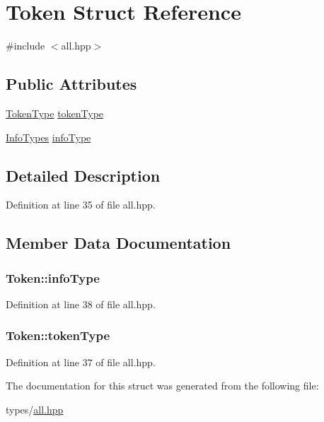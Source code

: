 \hypertarget{struct_token}{}\section{Token Struct Reference}
\label{struct_token}


{\ttfamily \#include $<$all.\+hpp$>$}

\subsection*{Public Attributes}
\begin{DoxyCompactItemize}
\item 
\hyperlink{arch_8hpp_aa520fbf142ba1e7e659590c07da31921}{Token\+Type} \hyperlink{struct_token_a3d2b3146021ae2acd9e1b33bf5e59c78}{token\+Type}
\item 
\hyperlink{all_8hpp_a58b4bafc5e94cba5e42b944a85b061db}{Info\+Types} \hyperlink{struct_token_a725d6f27445b5fdbb28a551c121779eb}{info\+Type}
\end{DoxyCompactItemize}


\subsection{Detailed Description}


Definition at line 35 of file all.\+hpp.



\subsection{Member Data Documentation}
\hypertarget{struct_token_a725d6f27445b5fdbb28a551c121779eb}{}
\subsubsection[{info\+Type}]{ Token\+::info\+Type}\label{struct_token_a725d6f27445b5fdbb28a551c121779eb}


Definition at line 38 of file all.\+hpp.

\hypertarget{struct_token_a3d2b3146021ae2acd9e1b33bf5e59c78}{}
\subsubsection[{token\+Type}]{ Token\+::token\+Type}\label{struct_token_a3d2b3146021ae2acd9e1b33bf5e59c78}


Definition at line 37 of file all.\+hpp.



The documentation for this struct was generated from the following file\+:\begin{DoxyCompactItemize}
\item 
types/\hyperlink{all_8hpp}{all.\+hpp}\end{DoxyCompactItemize}
